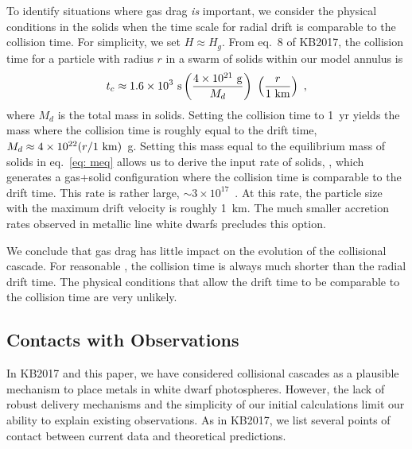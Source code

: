\documentclass[12pt,preprint]{aastex}
\begin{document}
To identify situations where gas drag \textit{is} important, we consider the 
physical conditions in the solids when the time scale for radial drift is 
comparable to the collision time. For simplicity, we set $H \approx H_g$.
From eq.~8 of KB2017, the collision time for a particle with radius $r$ in a 
swarm of solids within our model annulus is
\begin{equation}
t_c \approx 1.6 \times 10^3~{\rm s} 
\left ({ {4 \times 10^{21} ~ {\rm g}} \over M_d } \right ) ~ 
\left ({ r \over {\rm 1~km} } \right ) ~ ,
\label{eq: tc}
\end{equation}
where $M_d$ is the total mass in solids. Setting the collision time to 1~yr yields
the mass where the collision time is roughly equal to the drift time,
$M_d \approx 4 \times 10^{22} (r / {\rm 1~km}) $~g. Setting this mass equal to the 
equilibrium mass of solids in eq.~\ref{eq: meq} allows us to derive the input rate 
of solids, \mdotz, which generates a gas+solid configuration where the collision time 
is comparable to the drift time. This rate is rather large, $\sim 3 \times 10^{17}$~\gs. 
At this rate, the particle size with the maximum drift velocity is roughly 1~km. 
The much smaller accretion rates observed in metallic line white dwarfs precludes 
this option.

We conclude that gas drag has little impact on the evolution of the collisional 
cascade.  For reasonable \mdotz, the collision time is always much shorter than
the radial drift time. The physical conditions that allow the drift time to be
comparable to the collision time are very unlikely.

\subsection{Contacts with Observations}
\label{sec: disc-obs}

In KB2017 and this paper, we have considered collisional cascades as a plausible 
mechanism to place metals in white dwarf photospheres.  However, the lack of robust 
delivery mechanisms and the simplicity of our initial calculations limit our ability 
to explain existing observations. As in KB2017, we list several points of contact 
between current data and theoretical predictions.
\end{document}
